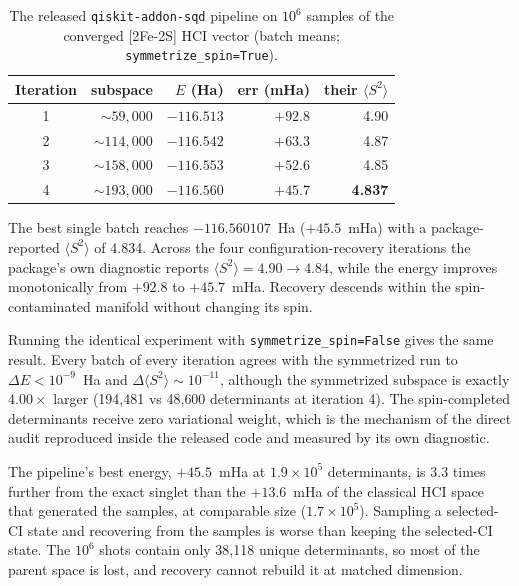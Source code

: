 \documentclass[11pt]{article}
\newcommand{\ssq}{\ensuremath{\langle S^2\rangle}}
\begin{document}
\begin{table}[ht]\centering\small
\caption{The released \texttt{qiskit-addon-sqd} pipeline on $10^6$ samples of the converged [2Fe-2S] HCI vector (batch means; \texttt{symmetrize\_spin=True}).}
\label{tab:asshipped}
\begin{tabular}{crrrr}
\toprule
Iteration & subspace & $E$ (Ha) & err (mHa) & their \ssq \\
\midrule
1 & ${\sim}59{,}000$ & $-116.513$ & $+92.8$ & 4.90 \\
2 & ${\sim}114{,}000$ & $-116.542$ & $+63.3$ & 4.87 \\
3 & ${\sim}158{,}000$ & $-116.553$ & $+52.6$ & 4.85 \\
4 & ${\sim}193{,}000$ & $-116.560$ & $\mathbf{+45.7}$ & \textbf{4.837} \\
\bottomrule
\end{tabular}
\end{table}

The best single batch reaches $-116.560107$~Ha ($+45.5$~mHa) with a package-reported \ssq{} of 4.834. Across the four configuration-recovery iterations the package's own diagnostic reports $\ssq = 4.90 \to 4.84$, while the energy improves monotonically from $+92.8$ to $+45.7$~mHa. Recovery descends within the spin-contaminated manifold without changing its spin.

Running the identical experiment with \texttt{symmetrize\_spin=False} gives the same result. Every batch of every iteration agrees with the symmetrized run to $\Delta E < 10^{-9}$~Ha and $\Delta\ssq \sim 10^{-11}$, although the symmetrized subspace is exactly $4.00\times$ larger (194{,}481 vs 48{,}600 determinants at iteration 4). The spin-completed determinants receive zero variational weight, which is the mechanism of the direct audit reproduced inside the released code and measured by its own diagnostic.

The pipeline's best energy, $+45.5$~mHa at $1.9\times10^5$ determinants, is 3.3 times further from the exact singlet than the $+13.6$~mHa of the classical HCI space that generated the samples, at comparable size ($1.7\times10^5$). Sampling a selected-CI state and recovering from the samples is worse than keeping the selected-CI state. The $10^6$ shots contain only 38{,}118 unique determinants, so most of the parent space is lost, and recovery cannot rebuild it at matched dimension.
\end{document}
